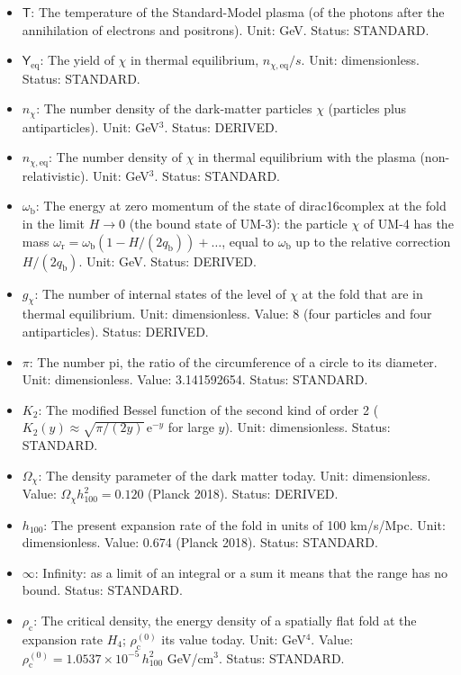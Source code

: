 \documentclass[
  10pt,
]{article}
\begin{document}
\begin{itemize}
  \(g_{\mathrm{s}}\): The effective number of relativistic degrees of
  freedom of the entropy density. Unit: dimensionless. Value: 3.909
  today. Status: STANDARD.
\item
  \(\mathsf{T}\): The temperature of the Standard-Model plasma (of the
  photons after the annihilation of electrons and positrons). Unit: GeV.
  Status: STANDARD.
\item
  \(\mathsf{Y}_{\mathrm{eq}}\): The yield of \(\chi\) in thermal
  equilibrium, \(n_{\chi,\mathrm{eq}}/s\). Unit: dimensionless. Status:
  STANDARD.
\item
  \(n_\chi\): The number density of the dark-matter particles \(\chi\)
  (particles plus antiparticles). Unit: GeV\(^3\). Status: DERIVED.
\item
  \(n_{\chi,\mathrm{eq}}\): The number density of \(\chi\) in thermal
  equilibrium with the plasma (non-relativistic). Unit: GeV\(^3\).
  Status: STANDARD.
\item
  \(\omega_{\mathrm{b}}\): The energy at zero momentum of the state of
  dirac16complex at the fold in the limit \(H \to 0\) (the bound state
  of UM-3): the particle \(\chi\) of UM-4 has the mass
  \(\omega_{\mathrm{r}} = \omega_{\mathrm{b}}(1 - H/(2q_{\mathrm{b}})) + \dots\),
  equal to \(\omega_{\mathrm{b}}\) up to the relative correction
  \(H/(2q_{\mathrm{b}})\). Unit: GeV. Status: DERIVED.
\item
  \(g_\chi\): The number of internal states of the level of \(\chi\) at
  the fold that are in thermal equilibrium. Unit: dimensionless. Value:
  8 (four particles and four antiparticles). Status: DERIVED.
\item
  \(\pi\): The number pi, the ratio of the circumference of a circle to
  its diameter. Unit: dimensionless. Value: 3.141592654. Status:
  STANDARD.
\item
  \(K_2\): The modified Bessel function of the second kind of order 2
  (\(K_2(y) \approx \sqrt{\pi/(2y)}\,\mathrm{e}^{-y}\) for large \(y\)).
  Unit: dimensionless. Status: STANDARD.
\item
  \(\Omega_\chi\): The density parameter of the dark matter today. Unit:
  dimensionless. Value: \(\Omega_\chi h_{100}^2 = 0.120\) (Planck 2018).
  Status: DERIVED.
\item
  \(h_{100}\): The present expansion rate of the fold in units of 100
  km/s/Mpc. Unit: dimensionless. Value: 0.674 (Planck 2018). Status:
  STANDARD.
\item
  \(\infty\): Infinity: as a limit of an integral or a sum it means that
  the range has no bound. Status: STANDARD.
\item
  \(\rho_{\mathrm{c}}\): The critical density, the energy density of a
  spatially flat fold at the expansion rate \(H_4\);
  \(\rho_{\mathrm{c}}^{(0)}\) its value today. Unit: GeV\(^4\). Value:
  \(\rho_{\mathrm{c}}^{(0)} = 1.0537\times10^{-5}\,h_{100}^2\)
  GeV/cm\(^3\). Status: STANDARD.
\end{itemize}
\end{document}
